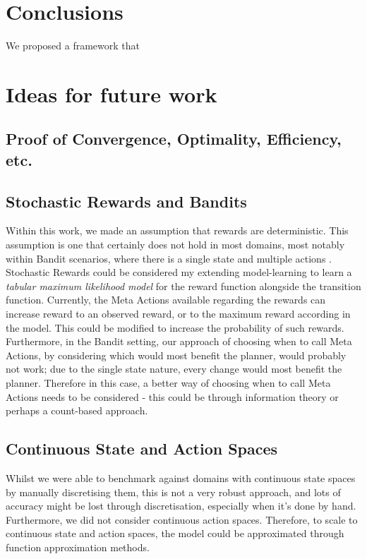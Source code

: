 \section{Conclusions}
We proposed a framework that 
\section{Ideas for future work}

\subsection{Proof of Convergence, Optimality, Efficiency, etc.}

\subsection{Stochastic Rewards and Bandits}
Within this work, we made an assumption that rewards are deterministic. This assumption is one that certainly does not hold in most domains, most notably within Bandit scenarios, where there is a single state and multiple actions \citep{lattimore}. Stochastic Rewards could be considered my extending model-learning to learn a \textit{tabular maximum likelihood model} for the reward function alongside the transition function. Currently, the Meta Actions available regarding the rewards can increase reward to an observed reward, or to the maximum reward according in the model. This could be modified to increase the probability of such rewards. Furthermore, in the Bandit setting, our approach of choosing when to call Meta Actions, by considering which would most benefit the planner, would probably not work; due to the single state nature, every change would most benefit the planner. Therefore in this case, a better way of choosing when to call Meta Actions needs to be considered - this could be through information theory or perhaps a count-based approach.
\subsection{Continuous State and Action Spaces}
Whilst we were able to benchmark against domains with continuous state spaces by manually discretising them, this is not a very robust approach, and lots of accuracy might be lost through discretisation, especially when it's done by hand. Furthermore, we did not consider continuous action spaces. Therefore, to scale to continuous state and action spaces, the model could be approximated through function approximation methods.
